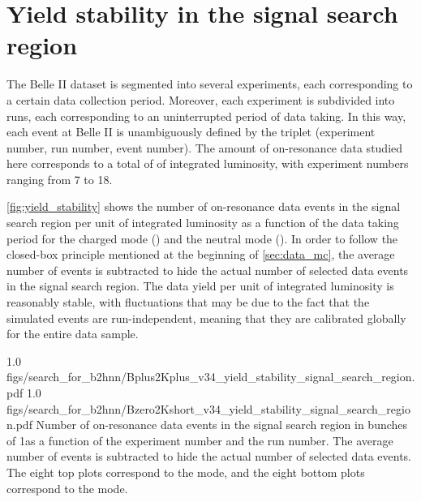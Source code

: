 \clearpage
\section{Yield stability in the signal search region} \label{sec:yield_stability}
The Belle II dataset is segmented into several experiments, each corresponding to a certain data collection period.
Moreover, each experiment is subdivided into runs, each corresponding to an uninterrupted period of data taking.
In this way, each event at Belle II is unambiguously defined by the triplet (experiment number, run number, event number).
The amount of on-resonance data studied here corresponds to a total of \lumion of integrated luminosity, with experiment numbers ranging from 7 to 18.

\cref{fig:yield_stability} shows the number of on-resonance data events in the signal search region per unit of integrated luminosity as a function of the data taking period for the charged mode (\BKpnn) and the neutral mode (\BKznn).
In order to follow the closed-box principle mentioned at the beginning of \cref{sec:data_mc}, the average number of events is subtracted to hide the actual number of selected data events in the signal search region.
The data yield per unit of integrated luminosity is reasonably stable, with fluctuations that may be due to the fact that the simulated events are run-independent, meaning that they are calibrated globally for the entire data sample.

{1.0}
{figs/search_for_b2hnn/Bplus2Kplus_v34_yield_stability_signal_search_region.pdf}
{1.0}
{figs/search_for_b2hnn/Bzero2Kshort_v34_yield_stability_signal_search_region.pdf}
{
Number of on-resonance data events in the signal search region in bunches of 1\invfb as a function of the experiment number and the run number.
The average number of events is subtracted to hide the actual number of selected data events.
The eight top plots correspond to the \BKpnn mode, and the eight bottom plots correspond to the \BKznn mode.
}
